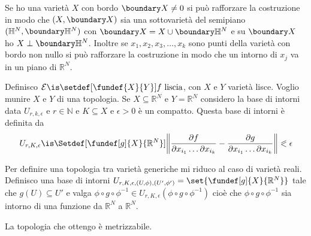 Se ho una varietà $X$ con bordo $\boundary X \neq 0$ si può rafforzare la costruzione in modo che $(X, \boundary X)$ sia una sottovarietà del semipiano 
$(\mathbb{H}^{N}, \boundary \mathbb{H}^{N})$ con $\boundary X = X \cup \boundary \mathbb{H}^{N}$ e su $\boundary X$ ho $X \perp \boundary \mathbb{H}^{N}$.
Inoltre se $x_{1}, x_{2}, x_{3}, \dots, x_{k}$ sono punti della varietà con bordo non nullo si può rafforzare la costruzione in modo che un intorno di $x_{j}$ va in un piano di $\mathbb{R}^{N}$.



\begin{defn}
Definisco $\mathcal{E} \is \setdef[\fundef{X}{Y}]{f\text{ liscia}}$, con $X$ e $Y$ varietà lisce. Voglio munire $X$ e $Y$ di una topologia. Se $X \subseteq \mathbb{R}^{N}$ e $Y = \mathbb{R}^{N}$ considero
la base di intorni data $U_{r, k, \epsilon}$ e $r \in \mathbb{N}$ e $K \subseteq X$ e $\epsilon > 0$ è un compatto. Questa base di intorni è definita da 
\[U_{r, K, \epsilon} \is \Setdef[{\fundef[g]{X}{\mathbb{R}^{N}}}]{\left\|\frac{\partial f}{\partial x_{i_{1}} \dots \partial x_{i_{k}}} - \frac{\partial g}{\partial x_{i_{1}} \dots \partial x_{i_{k}}}\right\| \eqslantless \epsilon}\]
\end{defn}



\begin{defn}
Per definire una topologia tra varietà generiche mi riduco al caso di varietà reali.
Definisco una base di intorni $U_{r, K, \epsilon, (U, \phi), (U', \phi')} = \set{\fundef[g]{X}{\mathbb{R}^{N}}}$ tale che $g(U) \subseteq U'$ e valga 
$\phi \circ g \circ \phi^{-1} \in U_{r, K, \epsilon}(\phi \circ g \circ \phi^{-1})$ cioè che $\phi \circ g \circ \phi^{-1}$ sia intorno di una funzione da $\mathbb{R}^{N}$ a $\mathbb{R}^{N}$.
\end{defn}

\begin{oss}
 La topologia che ottengo è metrizzabile.
\end{oss}








